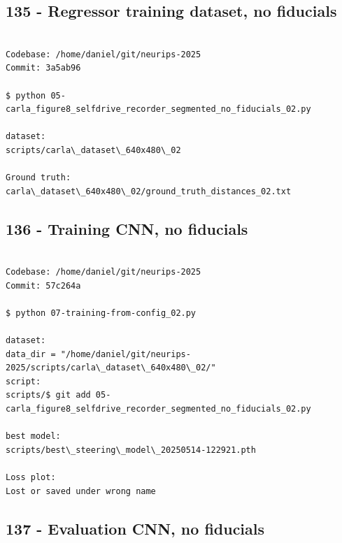 \subsection{135 - Regressor training dataset, no fiducials}
\label{app_res:135}

\begin{verbatim}

Codebase: /home/daniel/git/neurips-2025
Commit: 3a5ab96

$ python 05-carla_figure8_selfdrive_recorder_segmented_no_fiducials_02.py

dataset:
scripts/carla\_dataset\_640x480\_02

Ground truth:
carla\_dataset\_640x480\_02/ground_truth_distances_02.txt

\end{verbatim}

\subsection{136 - Training CNN, no fiducials}
\label{app_res:136}

\begin{verbatim}

Codebase: /home/daniel/git/neurips-2025
Commit: 57c264a

$ python 07-training-from-config_02.py

dataset:
data_dir = "/home/daniel/git/neurips-2025/scripts/carla\_dataset\_640x480\_02/" 
script:
scripts/$ git add 05-carla_figure8_selfdrive_recorder_segmented_no_fiducials_02.py

best model:
scripts/best\_steering\_model\_20250514-122921.pth

Loss plot:
Lost or saved under wrong name

\end{verbatim}

\subsection{137 - Evaluation CNN, no fiducials}
\label{app_res:137}

